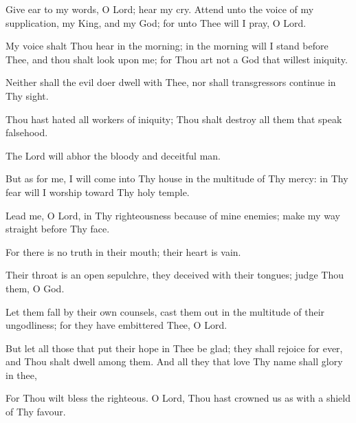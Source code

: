 Give ear to my words, O Lord; hear my cry. Attend unto the voice of my supplication, my King, and my God; for unto Thee will I pray, O Lord.

My voice shalt Thou hear in the morning; in the morning will I stand before Thee, and thou shalt look upon me; for Thou art not a God that willest iniquity.

Neither shall the evil doer dwell with Thee, nor shall transgressors continue in Thy sight.

Thou hast hated all workers of iniquity; Thou shalt destroy all them that speak falsehood.

The Lord will abhor the bloody and deceitful man.

But as for me, I will come into Thy house in the multitude of Thy mercy: in Thy fear will I worship toward Thy holy temple.

Lead me, O Lord, in Thy righteousness because of mine enemies; make my way straight before Thy face.

For there is no truth in their mouth; their heart is vain.

Their throat is an open sepulchre, they deceived with their tongues; judge Thou them, O God.

Let them fall by their own counsels, cast them out in the multitude of their ungodliness; for they have embittered Thee, O Lord.

But let all those that put their hope in Thee be glad; they shall rejoice for ever, and Thou shalt dwell among them. And all they that love Thy name shall glory in thee,

For Thou wilt bless the righteous. O Lord, Thou hast crowned us as with a shield of Thy favour.
